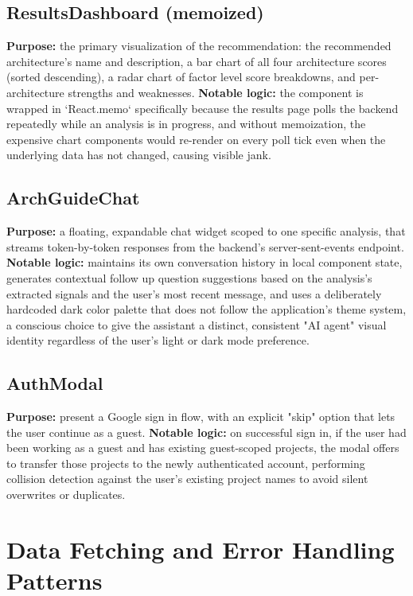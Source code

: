 \documentclass[11pt,a4paper]{report}
\begin{document}
\subsection{ResultsDashboard (memoized)}
\textbf{Purpose:} the primary visualization of the recommendation: the recommended architecture's name and description, a bar chart of all four architecture scores (sorted descending), a radar chart of factor level score breakdowns, and per-architecture strengths and weaknesses.
\textbf{Notable logic:} the component is wrapped in `React.memo` specifically because the results page polls the backend repeatedly while an analysis is in progress, and without memoization, the expensive chart components would re-render on every poll tick even when the underlying data has not changed, causing visible jank.

\subsection{ArchGuideChat}
\textbf{Purpose:} a floating, expandable chat widget scoped to one specific analysis, that streams token-by-token responses from the backend's server-sent-events endpoint.
\textbf{Notable logic:} maintains its own conversation history in local component state, generates contextual follow up question suggestions based on the analysis's extracted signals and the user's most recent message, and uses a deliberately hardcoded dark color palette that does not follow the application's theme system, a conscious choice to give the assistant a distinct, consistent "AI agent" visual identity regardless of the user's light or dark mode preference.

\subsection{AuthModal}
\textbf{Purpose:} present a Google sign in flow, with an explicit "skip" option that lets the user continue as a guest.
\textbf{Notable logic:} on successful sign in, if the user had been working as a guest and has existing guest-scoped projects, the modal offers to transfer those projects to the newly authenticated account, performing collision detection against the user's existing project names to avoid silent overwrites or duplicates.

\section{Data Fetching and Error Handling Patterns}
\end{document}
